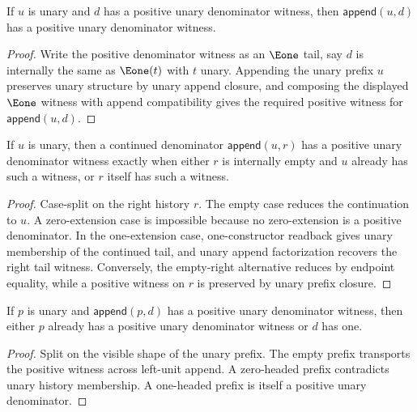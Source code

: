 \begin{theorem}
\label{thm:rat-positive-denominator-append-unary-prefix}
If $u$ is unary and $d$ has a positive unary denominator witness, then
$\mathsf{append}(u,d)$ has a positive unary denominator witness.
\end{theorem}
\begin{proof}
Write the positive denominator witness as an $\Eone$ tail, say $d$ is
internally the same as $\Eone(t)$ with $t$ unary. Appending the unary prefix
$u$ preserves unary structure by unary append closure, and composing the
displayed $\Eone$ witness with append compatibility gives the required
positive witness for $\mathsf{append}(u,d)$.
\end{proof}

\begin{theorem}
\label{thm:positive-unary-denominator-append-unary-left-iff}
If $u$ is unary, then a continued denominator
$\mathsf{append}(u,r)$ has a positive unary denominator witness exactly when
either $r$ is internally empty and $u$ already has such a witness, or $r$
itself has such a witness.
\end{theorem}
\begin{proof}
Case-split on the right history $r$. The empty case reduces the continuation
to $u$. A zero-extension case is impossible because no zero-extension is a
positive denominator. In the one-extension case, one-constructor readback gives
unary membership of the continued tail, and unary append factorization recovers
the right tail witness. Conversely, the empty-right alternative reduces by
endpoint equality, while a positive witness on $r$ is preserved by unary
prefix closure.
\end{proof}

\begin{theorem}
\label{thm:positive-unary-denominator-append-unary-left-split}
If $p$ is unary and $\mathsf{append}(p,d)$ has a positive unary denominator
witness, then either $p$ already has a positive unary denominator witness or
$d$ has one.
\end{theorem}
\begin{proof}
Split on the visible shape of the unary prefix. The empty prefix transports the
positive witness across left-unit append. A zero-headed prefix contradicts unary
history membership. A one-headed prefix is itself a positive unary denominator.
\end{proof}

